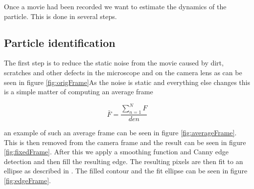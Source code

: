 Once a movie had been recorded we want to estimate the dynamics of the particle. This is done in several steps. 

\subsection{Particle identification}

The first step is to reduce the static noise from the movie caused by dirt, scratches and other defects in the microscope and on the camera lens as can be seen in figure \ref{fig:origFrame}As the noise is static and everything else changes this is a simple matter of computing an average frame

\begin{equation}\label{eq:averageFrame}
\bar{F} = \frac{\sum\limits_{n=1}^{N} F }{den}
\end{equation}

an example of such an average frame can be seen in figure \ref{fig:averageFrame}. This is then removed from the camera frame and the result can be seen in figure \ref{fig:fixedFrame}. After this we apply a smoothing function and Canny edge detection \cite{Canny} and then fill the resulting edge. The resulting pixels are then fit to an ellipse as described in \cite{AntonThesis, EllipseFit}. The filled contour and the fit ellipse can be seen in figure \ref{fig:edgeFrame}.

